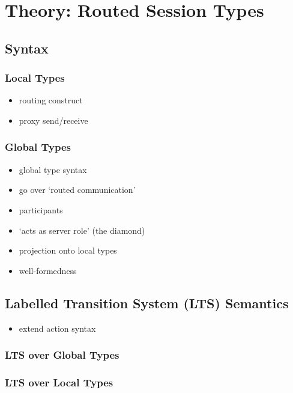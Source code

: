 \chapter{Theory: Routed Session Types}

\section{Syntax}

\subsection{Local Types}

\begin{itemize}
\item routing construct
\item proxy send/receive
\end{itemize}

\subsection{Global Types}

\begin{itemize}
\item global type syntax
\item go over `routed communication'
\item participants
\item `acts as server role' (the diamond)
\item projection onto local types
\item well-formedness
\end{itemize}

\section{Labelled Transition System (LTS) Semantics}

\begin{itemize}
\item extend action syntax
\end{itemize}

\subsection{LTS over Global Types}

\subsection{LTS over Local Types}

